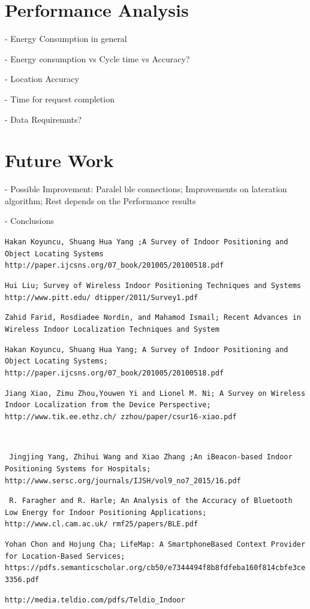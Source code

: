 \documentclass[a4paper]{IEEEtran}
\begin{document}
\section{Performance Analysis}
\label{sec:performance}

- Energy Consumption in general

- Energy consumption vs Cycle time vs Accuracy?

- Location Accuracy

- Time for request completion

- Data Requiremnts?
 



\section{Future Work}
\label{sec:future}

- Possible Improvement: Paralel ble connections; Improvements on lateration algorithm;  Rest depends on the Performance results

- Conclusions




\begin{thebibliography}{9}

 \texttt{Hakan Koyuncu, Shuang Hua Yang ;A Survey of Indoor Positioning and Object Locating Systems http://paper.ijcsns.org/07_book/201005/20100518.pdf}

 \texttt{Hui Liu; Survey of Wireless Indoor Positioning Techniques and Systems http://www.pitt.edu/~dtipper/2011/Survey1.pdf} 

 \texttt{Zahid Farid, Rosdiadee Nordin, and Mahamod Ismail; Recent Advances in Wireless Indoor Localization Techniques and System}

 \texttt{Hakan Koyuncu, Shuang Hua Yang; A Survey of Indoor Positioning and Object Locating Systems; http://paper.ijcsns.org/07_book/201005/20100518.pdf}

 \texttt{Jiang Xiao, Zimu Zhou,Youwen Yi and Lionel M. Ni; A Survey on Wireless Indoor Localization from the Device Perspective; http://www.tik.ee.ethz.ch/~zzhou/paper/csur16-xiao.pdf}

\texttt{ }

\texttt{ Jingjing Yang, Zhihui Wang and Xiao Zhang ;An iBeacon-based Indoor Positioning Systems for Hospitals; http://www.sersc.org/journals/IJSH/vol9_no7_2015/16.pdf}

\texttt{ R. Faragher and R. Harle; An Analysis of the Accuracy of Bluetooth Low Energy for Indoor Positioning Applications; http://www.cl.cam.ac.uk/~rmf25/papers/BLE.pdf}

\texttt{Yohan Chon and Hojung Cha; LifeMap: A SmartphoneBased Context Provider for Location-Based Services; https://pdfs.semanticscholar.org/cb50/e7344494f8b8fdfeba160f814cbfe3ce3356.pdf}

\texttt{http://media.teldio.com/pdfs/Teldio_Indoor}

 
 
\end{thebibliography}
\end{document}

